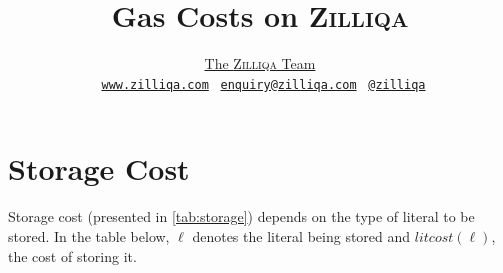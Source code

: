 \documentclass[9pt]{article}
\begin{document}
\title{\vspace{-2cm}
 \textbf{Gas Costs on \textsc{Zilliqa}}}

\author{
 	\href{https://www.zilliqa.com/team.html}{The \textsc{Zilliqa} Team} \\
    \Mundus~\href{https://www.zilliqa.com}{\texttt{www.zilliqa.com}}
\Letter~\href{mailto:enquiry@zilliqa.com}{\texttt{enquiry@zilliqa.com}}
\faTwitter~\href{https://twitter.com/zilliqa}{\texttt{@zilliqa}
}}


\maketitle

\section{Storage Cost}

Storage cost (presented in \autoref{tab:storage}) depends on the type of
literal to be stored. In the table below, $\ell$ denotes the literal being
stored and $litcost(\ell)$, the cost of storing it.
\end{document}
